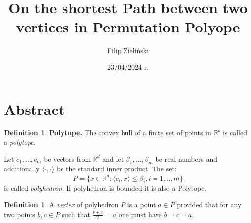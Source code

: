 \documentclass{article}
\title{%
  \huge On the shortest Path between two vertices in Permutation Polyope}
\author{Filip Zieliński}
\date{23/04/2024 r.}
\theoremstyle{plain}
\theoremstyle{definition}
\newtheorem{definition}[thm]{Definition}
\begin{document}
\maketitle
\section{Abstract}
\begin{definition} \label{def2}
    \textbf{Polytope.} The convex hull of a finite set of points in $ \mathbb{R}^d$ is called a \textit{polytope}.
\end{definition}
    Let $c_{1},..., c_{m}$ be vectors from $ \mathbb{R}^d$ and let $\beta_{1}, ... , \beta_{m}$ be real numbers and additionally $\langle \cdot,\cdot \rangle$ be  the standard inner product. The set:
    $$P = \{ x \in \mathbb{R}^d : \langle c_{i},x \rangle \leq \beta_{i},  i=1,..,m\}$$
    is called \textit{polyhedron.}
If polyhedron is bounded it is also a Polytope. 
\begin{definition}
        A \textit{vertex} of polyhedron $P$ is a point $a \in P$ provided that for any two points $b,c \in P$  such that $\frac{b+c}{2} = a$ one must have $b = c = a$.
\end{definition}
\end{document}
